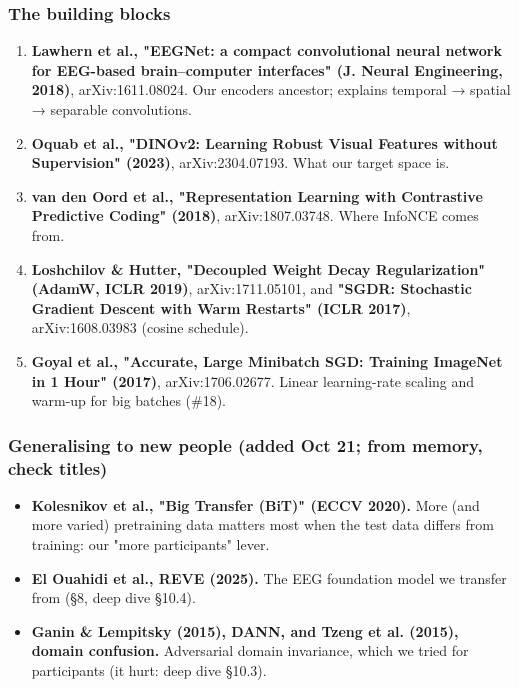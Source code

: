 \documentclass[
  11pt,
]{article}
\providecommand{\tightlist}{%
  \setlength{\itemsep}{0pt}\setlength{\parskip}{0pt}}
\renewcommand{\_}{\oldunderscore\allowbreak}
\begin{document}
\subsubsection{The building
blocks}\label{the-building-blocks}

\begin{enumerate}
\def\labelenumi{\arabic{enumi}.}
\setcounter{enumi}{10}
\tightlist
\item
  \textbf{Lawhern et al., "EEGNet: a
  compact convolutional neural network
  for EEG-based brain--computer
  interfaces" (J. Neural Engineering,
  2018)}, arXiv:1611.08024. Our
  encoder\textquotesingle s ancestor;
  explains temporal → spatial →
  separable convolutions.
\item
  \textbf{Oquab et al., "DINOv2:
  Learning Robust Visual Features
  without Supervision" (2023)},
  arXiv:2304.07193. What our target
  space is.
\item
  \textbf{van den Oord et al.,
  "Representation Learning with
  Contrastive Predictive Coding"
  (2018)}, arXiv:1807.03748. Where
  InfoNCE comes from.
\item
  \textbf{Loshchilov \& Hutter,
  "Decoupled Weight Decay
  Regularization" (AdamW, ICLR 2019)},
  arXiv:1711.05101, and \textbf{"SGDR:
  Stochastic Gradient Descent with Warm
  Restarts" (ICLR 2017)},
  arXiv:1608.03983 (cosine schedule).
\item
  \textbf{Goyal et al., "Accurate, Large
  Minibatch SGD: Training ImageNet in 1
  Hour" (2017)}, arXiv:1706.02677.
  Linear learning-rate scaling and
  warm-up for big batches (\#18).
\end{enumerate}

\subsubsection{Generalising to new
people (added Oct 21; from memory, check
titles)}\label{generalising-to-new-people-added-oct-21-from-memory-check-titles}

\begin{itemize}
\tightlist
\item
  \textbf{Kolesnikov et al., "Big
  Transfer (BiT)" (ECCV 2020).} More
  (and more varied) pretraining data
  matters most when the test data
  differs from training: our "more
  participants" lever.
\item
  \textbf{El Ouahidi et al., REVE
  (2025).} The EEG foundation model we
  transfer from (§8, deep dive §10.4).
\item
  \textbf{Ganin \& Lempitsky (2015),
  DANN, and Tzeng et al. (2015), domain
  confusion.} Adversarial domain
  invariance, which we tried for
  participants (it hurt: deep dive
  §10.3).
\end{itemize}
\end{document}
